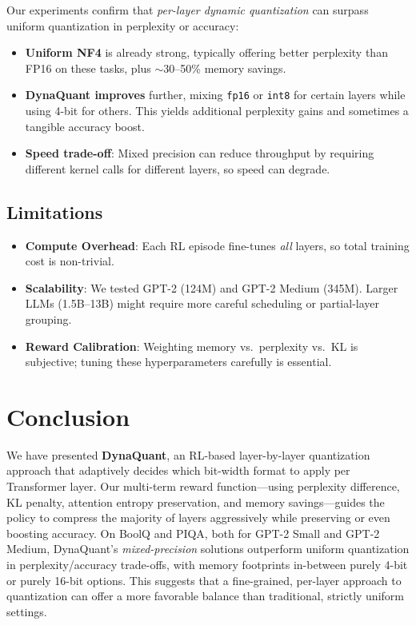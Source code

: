 \documentclass{article}
\begin{document}
	Our experiments confirm that \emph{per-layer dynamic quantization} can surpass uniform quantization in perplexity or accuracy:
	
	\begin{itemize}
		\item \textbf{Uniform NF4} is already strong, typically offering better perplexity than FP16 on these tasks, plus $\sim$30--50\% memory savings.
		\item \textbf{DynaQuant improves} further, mixing \texttt{fp16} or \texttt{int8} for certain layers while using 4-bit for others. This yields additional perplexity gains and sometimes a tangible accuracy boost.
		\item \textbf{Speed trade-off}: Mixed precision can reduce throughput by requiring different kernel calls for different layers, so speed can degrade.
	\end{itemize}
	
	\subsection{Limitations}
	\label{sec:limitations}
	
	\begin{itemize}
		\item \textbf{Compute Overhead}: Each RL episode fine-tunes \emph{all} layers, so total training cost is non-trivial.
		\item \textbf{Scalability}: We tested GPT-2 (124M) and GPT-2 Medium (345M). Larger LLMs (1.5B--13B) might require more careful scheduling or partial-layer grouping.
		\item \textbf{Reward Calibration}: Weighting memory vs.\ perplexity vs.\ KL is subjective; tuning these hyperparameters carefully is essential.
	\end{itemize}
	
	\section{Conclusion}
	\label{sec:conclusion}
	
	We have presented \textbf{DynaQuant}, an RL-based layer-by-layer quantization approach that adaptively decides which bit-width format to apply per Transformer layer. Our multi-term reward function—using perplexity difference, KL penalty, attention entropy preservation, and memory savings—guides the policy to compress the majority of layers aggressively while preserving or even boosting accuracy. On BoolQ and PIQA, both for GPT-2 Small and GPT-2 Medium, DynaQuant’s \emph{mixed-precision} solutions outperform uniform quantization in perplexity/accuracy trade-offs, with memory footprints in-between purely 4-bit or purely 16-bit options. This suggests that a fine-grained, per-layer approach to quantization can offer a more favorable balance than traditional, strictly uniform settings.
		
\end{document}
